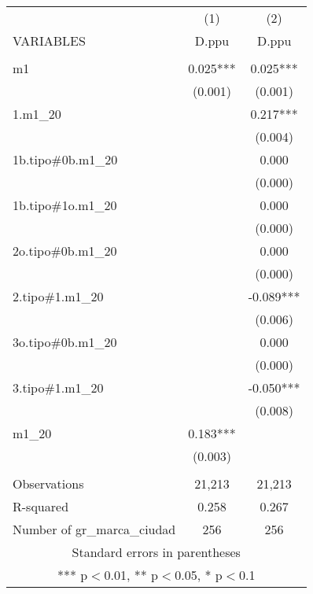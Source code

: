 \begin{tabular}{lcc} \hline
 & (1) & (2) \\
VARIABLES & D.ppu & D.ppu \\ \hline
 &  &  \\
m1 & 0.025*** & 0.025*** \\
 & (0.001) & (0.001) \\
1.m1\_20 &  & 0.217*** \\
 &  & (0.004) \\
1b.tipo\#0b.m1\_20 &  & 0.000 \\
 &  & (0.000) \\
1b.tipo\#1o.m1\_20 &  & 0.000 \\
 &  & (0.000) \\
2o.tipo\#0b.m1\_20 &  & 0.000 \\
 &  & (0.000) \\
2.tipo\#1.m1\_20 &  & -0.089*** \\
 &  & (0.006) \\
3o.tipo\#0b.m1\_20 &  & 0.000 \\
 &  & (0.000) \\
3.tipo\#1.m1\_20 &  & -0.050*** \\
 &  & (0.008) \\
m1\_20 & 0.183*** &  \\
 & (0.003) &  \\
 &  &  \\
Observations & 21,213 & 21,213 \\
R-squared & 0.258 & 0.267 \\
 Number of gr\_marca\_ciudad & 256 & 256 \\ \hline
\multicolumn{3}{c}{ Standard errors in parentheses} \\
\multicolumn{3}{c}{ *** p$<$0.01, ** p$<$0.05, * p$<$0.1} \\
\end{tabular}
